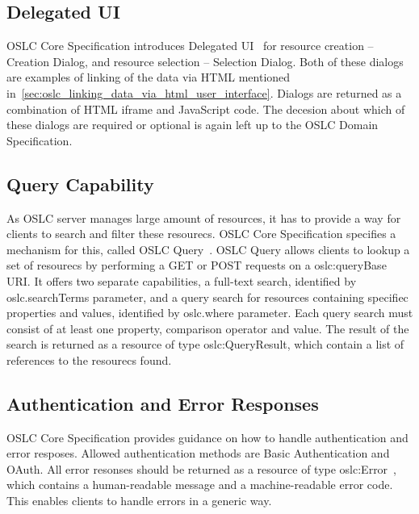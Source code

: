 \subsection*{Delegated UI}
OSLC Core Specification introduces Delegated UI \cite{oslc_core_delegated_ui} for resource creation -- Creation Dialog, and resource selection -- Selection Dialog. Both of these dialogs are examples of linking of the data via HTML mentioned in \ref{sec:oslc_linking_data_via_html_user_interface}. Dialogs are returned as a combination of HTML iframe and JavaScript code. The decesion about which of these dialogs are required or optional is again left up to the OSLC Domain Specification.

\subsection*{Query Capability}
As OSLC server manages large amount of resources, it has to provide a way for clients to search and filter these resourecs. OSLC Core Specification specifies a mechanism for this, called OSLC Query \cite{oslc_core_query}. OSLC Query allows clients to lookup a set of resourecs by performing a GET or POST requests on a oslc:queryBase URI. It offers two separate capabilities, a full-text search, identified by oslc.searchTerms parameter, and a query search for resources containing specifiec properties and values, identified by oslc.where parameter. Each query search must consist of at least one property, comparison operator and value. The result of the search is returned as a resource of type oslc:QueryResult, which contain a list of references to the resourecs found.

\subsection*{Authentication and Error Responses}
OSLC Core Specification provides guidance on how to handle authentication and error resposes. Allowed authentication methods are Basic Authentication and OAuth. All error resonses should be returned as a resource of type oslc:Error \cite{oslc_core_error}, which contains a human-readable message and a machine-readable error code. This enables clients to handle errors in a generic way.

